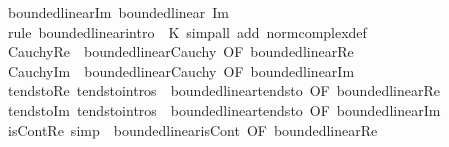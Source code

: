 \begin{isabellebody}
\endisatagproof
{\isafoldproof}%
%
\isadelimproof
\isanewline
%
\endisadelimproof
\isanewline
{}\isamarkupfalse%
\ bounded{\isacharunderscore}{\kern0pt}linear{\isacharunderscore}{\kern0pt}Im{\isacharcolon}{\kern0pt}\ {\isachardoublequoteopen}bounded{\isacharunderscore}{\kern0pt}linear\ Im{\isachardoublequoteclose}\isanewline
%
\isadelimproof
\ \ %
\endisadelimproof
%
\isatagproof
{}\isamarkupfalse%
\ {\isacharparenleft}{\kern0pt}rule\ bounded{\isacharunderscore}{\kern0pt}linear{\isacharunderscore}{\kern0pt}intro\ {\isacharbrackleft}{\kern0pt}\ K{\isacharequal}{\kern0pt}{}{\isacharbrackright}{\kern0pt}{\isacharparenright}{\kern0pt}\ {\isacharparenleft}{\kern0pt}simp{\isacharunderscore}{\kern0pt}all\ add{\isacharcolon}{\kern0pt}\ norm{\isacharunderscore}{\kern0pt}complex{\isacharunderscore}{\kern0pt}def{\isacharparenright}{\kern0pt}%
\endisatagproof
{\isafoldproof}%
%
\isadelimproof
\isanewline
%
\endisadelimproof
\isanewline
{}\isamarkupfalse%
\ Cauchy{\isacharunderscore}{\kern0pt}Re\ {\isacharequal}{\kern0pt}\ bounded{\isacharunderscore}{\kern0pt}linear{\isachardot}{\kern0pt}Cauchy\ {\isacharbrackleft}{\kern0pt}OF\ bounded{\isacharunderscore}{\kern0pt}linear{\isacharunderscore}{\kern0pt}Re{\isacharbrackright}{\kern0pt}\isanewline
{}\isamarkupfalse%
\ Cauchy{\isacharunderscore}{\kern0pt}Im\ {\isacharequal}{\kern0pt}\ bounded{\isacharunderscore}{\kern0pt}linear{\isachardot}{\kern0pt}Cauchy\ {\isacharbrackleft}{\kern0pt}OF\ bounded{\isacharunderscore}{\kern0pt}linear{\isacharunderscore}{\kern0pt}Im{\isacharbrackright}{\kern0pt}\isanewline
{}\isamarkupfalse%
\ tendsto{\isacharunderscore}{\kern0pt}Re\ {\isacharbrackleft}{\kern0pt}tendsto{\isacharunderscore}{\kern0pt}intros{\isacharbrackright}{\kern0pt}\ {\isacharequal}{\kern0pt}\ bounded{\isacharunderscore}{\kern0pt}linear{\isachardot}{\kern0pt}tendsto\ {\isacharbrackleft}{\kern0pt}OF\ bounded{\isacharunderscore}{\kern0pt}linear{\isacharunderscore}{\kern0pt}Re{\isacharbrackright}{\kern0pt}\isanewline
{}\isamarkupfalse%
\ tendsto{\isacharunderscore}{\kern0pt}Im\ {\isacharbrackleft}{\kern0pt}tendsto{\isacharunderscore}{\kern0pt}intros{\isacharbrackright}{\kern0pt}\ {\isacharequal}{\kern0pt}\ bounded{\isacharunderscore}{\kern0pt}linear{\isachardot}{\kern0pt}tendsto\ {\isacharbrackleft}{\kern0pt}OF\ bounded{\isacharunderscore}{\kern0pt}linear{\isacharunderscore}{\kern0pt}Im{\isacharbrackright}{\kern0pt}\isanewline
{}\isamarkupfalse%
\ isCont{\isacharunderscore}{\kern0pt}Re\ {\isacharbrackleft}{\kern0pt}simp{\isacharbrackright}{\kern0pt}\ {\isacharequal}{\kern0pt}\ bounded{\isacharunderscore}{\kern0pt}linear{\isachardot}{\kern0pt}isCont\ {\isacharbrackleft}{\kern0pt}OF\ bounded{\isacharunderscore}{\kern0pt}linear{\isacharunderscore}{\kern0pt}Re{\isacharbrackright}{\kern0pt}\isanewline

\end{isabellebody}
